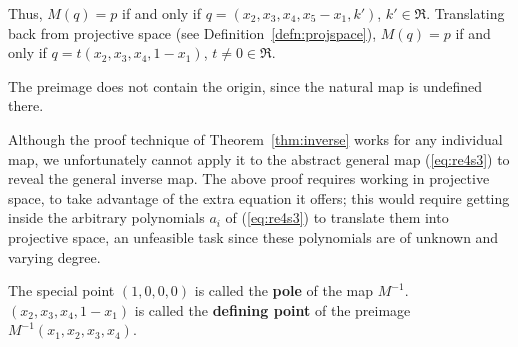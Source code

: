 Thus, $M(q) = p$ if and only if 
$q = (x_2,x_3,x_4,x_5 - x_1,k')$, $k' \in \Re$.
Translating back from projective space (see Definition~\ref{defn:projspace}),
$M(q) = p$ if and only if 
$q = t(x_2,x_3,x_4, 1-x_1)$, $t \neq 0 \in \Re$.

The preimage does not contain the origin, since the natural
map is undefined there.
\QED


\begin{rmk}
Although the proof technique of Theorem~\ref{thm:inverse}
works for any individual map,
we unfortunately cannot apply it to the abstract general map (\ref{eq:re4s3})
to reveal the general inverse map.
The above proof requires working in projective space, to take 
advantage of the extra equation it offers;
this would require getting inside the arbitrary polynomials
$a_i$ of (\ref{eq:re4s3}) to translate them into projective space,
an unfeasible task
since these polynomials are of unknown and varying degree.
\end{rmk}


%
\begin{defn2}
\label{defn:pole}
The special point $(1,0,0,0)$ is called the {\bf pole} of the map $M^{-1}$.\\
$(x_2,x_3,x_4,1-x_1)$ is called the {\bf defining point} of the preimage 
$M^{-1}(x_1,x_2,x_3,x_4)$.
\end{defn2}



